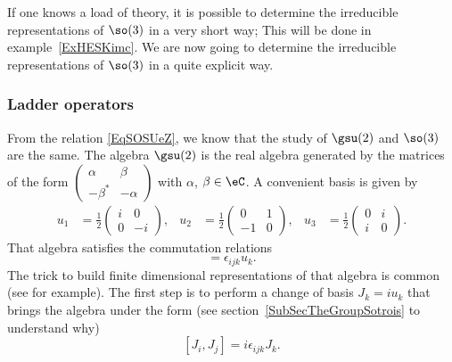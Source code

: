 If one knows a load of theory, it is possible to determine the irreducible representations of \( \so(3)\) in a very short way; This will be done in example~\ref{ExHESKimc}. We are now going to determine the irreducible representations of \( \so(3)\) in a quite explicit way.

\subsubsection{Ladder operators}

From the relation \eqref{EqSOSUeZ}, we know that the study of $\gsu(2)$ and $\so(3)$ are the same. The algebra $\gsu(2)$ is the real algebra generated by the matrices of the form
$
\begin{pmatrix}
\alpha  &\beta\\
-\beta^*&-\alpha
\end{pmatrix}
$ with $\alpha$, $\beta\in\eC$. A convenient basis is given by
\begin{align}       \label{EqGenssudeux}
u_1&=\frac{ 1 }{2}
\begin{pmatrix}
  i &   0   \\
  0 &   -i
\end{pmatrix},
&u_2&=
\frac{ 1 }{2}
\begin{pmatrix}
  0 &   1   \\
  -1    &   0
\end{pmatrix},
&u_3&=\frac{ 1 }{2}
\begin{pmatrix}
  0 &   i   \\
  i &   0
\end{pmatrix}.
\end{align}
That algebra satisfies the commutation relations
\begin{equation}
    [u_i,u_j]=\epsilon_{ijk}u_k.
\end{equation}
The trick to build finite dimensional representations of that algebra is common (see \cite{MQSenechal} for example). The first step is to perform a change of basis $J_k=iu_k$ that brings the algebra under the form (see section~\ref{SubSecTheGroupSotrois} to understand why)
\begin{equation}        \label{EqAlgsuiepsijk}
    [J_i,J_j]=i\epsilon_{ijk}J_k.
\end{equation}
